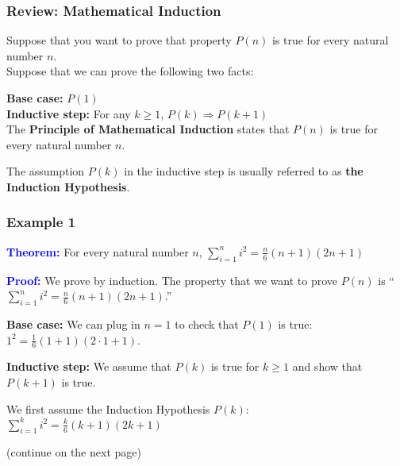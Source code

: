 

\begin{frame}\frametitle{Review: Mathematical Induction}
  \begin{tcolorbox}
    Suppose that you want to prove that property $P(n)$ is true for
    every natural number $n$.\\
    
    Suppose that we can prove the following two facts:
    
    {\bf Base case:} $P(1)$ \\
    {\bf Inductive step:} For any $k\geq 1$, $P(k)\Rightarrow P(k+1)$ \\
    
    The {\bf Principle of Mathematical Induction} states that $P(n)$
    is true for every natural number $n$.
  \end{tcolorbox}

  The assumption $P(k)$ in the inductive step is usually referred to
  as {\bf the Induction Hypothesis}.
\end{frame}

\begin{frame}\frametitle{Example 1}
  {\bf \textcolor{blue}{Theorem:}}
  For every natural number $n$, $\sum_{i=1}^n i^2 = \frac{n}{6}(n+1)(2n+1)$
  \vspace{0.15in}
  
  {\bf \textcolor{blue}{Proof:}}
  We prove by induction.  The property that we want to prove $P(n)$
  is ``$\sum_{i=1}^n i^2 = \frac{n}{6}(n+1)(2n+1)$.''
  \vspace{0.15in}
    
  {\bf Base case:} We can plug in $n=1$ to check that $P(1)$ is
  true: $1^2 = \frac{1}{6}(1+1)(2\cdot 1+1)$.
  \vspace{0.15in}

  {\bf Inductive step:} We assume that $P(k)$ is true for $k\geq 1$
  and show that $P(k+1)$ is true.
  \vspace{0.15in}

  We first assume the Induction Hypothesis $P(k)$: $ \sum_{i=1}^k
  i^2 = \frac{k}{6}(k+1)(2k+1)$
  \vspace{0.15in}

  (continue on the next page)
\end{frame}

